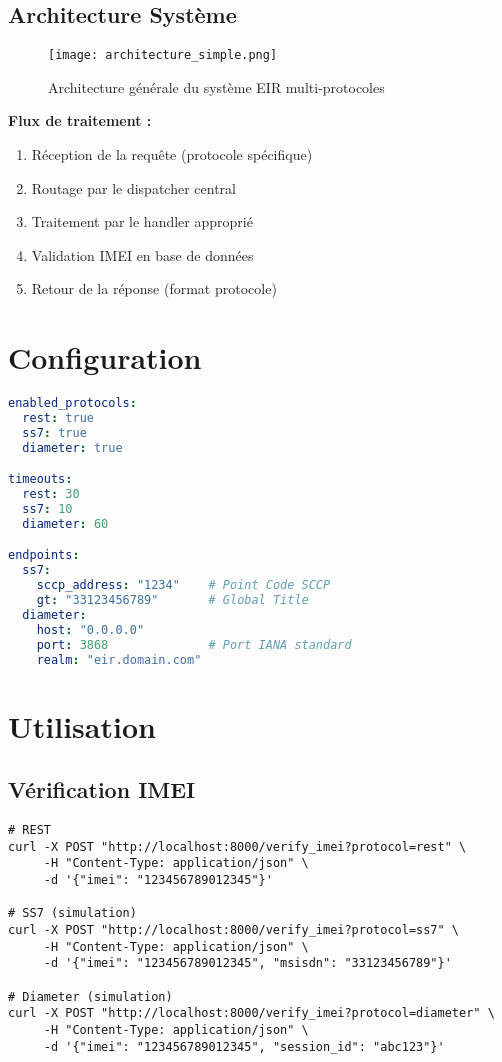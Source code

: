 \documentclass[11pt]{article}
\begin{document}
\subsection{Architecture Système}

\begin{figure}[H]
\centering
\texttt{[image: architecture\_simple.png]}
\caption{Architecture générale du système EIR multi-protocoles}
\label{fig:architecture_system}
\end{figure}

\textbf{Flux de traitement :}
\begin{enumerate}
    \item Réception de la requête (protocole spécifique)
    \item Routage par le dispatcher central
    \item Traitement par le handler approprié
    \item Validation IMEI en base de données
    \item Retour de la réponse (format protocole)
\end{enumerate}

\section{Configuration}

\begin{lstlisting}[language=yaml,caption=config/protocols.yml]
enabled_protocols:
  rest: true
  ss7: true  
  diameter: true

timeouts:
  rest: 30
  ss7: 10
  diameter: 60

endpoints:
  ss7:
    sccp_address: "1234"    # Point Code SCCP
    gt: "33123456789"       # Global Title
  diameter:
    host: "0.0.0.0"
    port: 3868              # Port IANA standard
    realm: "eir.domain.com"
\end{lstlisting}

\section{Utilisation}

\subsection{Vérification IMEI}
\begin{lstlisting}[caption=Requêtes par protocole]
# REST
curl -X POST "http://localhost:8000/verify_imei?protocol=rest" \
     -H "Content-Type: application/json" \
     -d '{"imei": "123456789012345"}'

# SS7 (simulation)
curl -X POST "http://localhost:8000/verify_imei?protocol=ss7" \
     -H "Content-Type: application/json" \
     -d '{"imei": "123456789012345", "msisdn": "33123456789"}'

# Diameter (simulation)
curl -X POST "http://localhost:8000/verify_imei?protocol=diameter" \
     -H "Content-Type: application/json" \
     -d '{"imei": "123456789012345", "session_id": "abc123"}'
\end{lstlisting}
\end{document}
